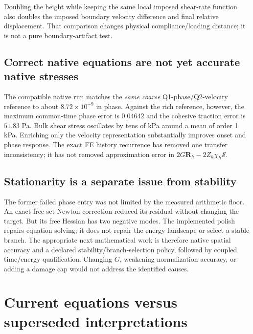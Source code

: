 \documentclass[11pt,a4paper]{article}
\newcommand{\Smat}{\bm{\mathcal S}}
\newcommand{\R}{\bm R}
\begin{document}
Doubling the height while keeping the same local imposed shear-rate function
also doubles the imposed boundary velocity difference and final relative
displacement. That comparison changes physical compliance/loading distance;
it is not a pure boundary-artifact test.

\subsection{Correct native equations are not yet accurate native stresses}

The compatible native run matches the \emph{same coarse} Q1-phase/Q2-velocity
reference to about $8.72\times10^{-9}$ in phase. Against the rich reference,
however, the maximum common-time phase error is $0.04642$ and the cohesive
traction error is $51.83$ Pa. Bulk shear stress oscillates by tens of kPa around
a mean of order 1 kPa. Enriching only the velocity representation substantially
improves onset and phase response. The exact FE history recurrence has removed
one transfer inconsistency; it has not removed approximation error in
$2G\R_h-2Z_h\chi_h\Smat$.

\subsection{Stationarity is a separate issue from stability}

The former failed phase entry was not limited by the measured arithmetic floor.
An exact free-set Newton correction reduced its residual without changing the
target. But its free Hessian has two negative modes. The implemented polish
repairs equation solving; it does not repair the energy landscape or select a
stable branch. The appropriate next mathematical work is therefore native
spatial accuracy and a declared stability/branch-selection policy, followed by
coupled time/energy qualification. Changing $G$, weakening normalization
accuracy, or adding a damage cap would not address the identified causes.

\section{Current equations versus superseded interpretations}
\end{document}
